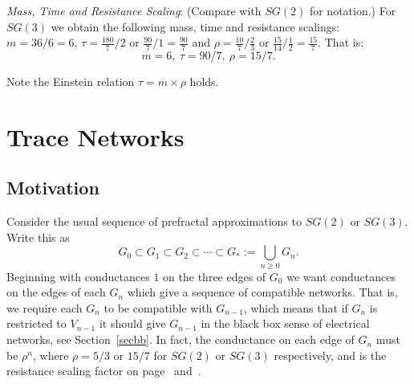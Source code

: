 \documentclass[a4paper]{amsart}
\theoremstyle{plain}
\theoremstyle{definition}
\theoremstyle{remark}
\begin{document}
%
 
 \medskip
\emph{Mass, Time and Resistance Scaling}:  \label{sc3}(Compare with $ SG(2) $ for notation.)  For $ SG(3) $ we obtain  the following mass, time and resistance scalings:
$ m =  {36}/{6}=6$,  $   \tau = \frac{180}{7}\Big/2 \text{ or } \frac{90}{7}\Big/ 1 = \frac{90}{7}$  and   
  $ \rho = \frac{10}{7}\Big/\frac{2}{3}  \text{ or } \frac{15}{14}\Big/ \frac{1}{2}  = \frac{15}{7}$.
That is:
\begin{equation} \label{rssg3}
\boxed{m = 6,\  \tau = 90/7,\  \rho = 15/7.}
\end{equation} 

 Note the Einstein relation
$  \tau = m \times \rho $ 
holds. 




\section{\textbf{Trace Networks}}\label{secTN}

\subsection{Motivation} 

Consider the usual sequence of prefractal approximations to $ SG(2) $ or $ SG(3) $.
Write this as 
\[
G_0 \subset G_1 \subset G_2 \subset \cdots \subset G_*:=\bigcup_{n\geq 0}G_n.
\]
Beginning with conductances $ 1 $ on the three edges of $ G_0 $ we want conductances on the edges of each $ G_n $ which  give a sequence of compatible networks. That is, we require each $ G_n $ to be compatible with $ G_{n-1} $, which means that if $ G_{n} $ is restricted to $ V_{n-1} $ it should give $ G_{n-1} $ in the black box sense of electrical networks, see Section~\ref{secbb}.  In fact, the conductance  on each edge of $ G_n $ must
 be $  \rho^n  $, where $ \rho =5/3$ or $ 15/7 $ for $ SG(2) $ or $ SG(3) $ respectively,  and is the resistance scaling  factor on page~\pageref{sc2} and~\pageref{sc3}.
 
\end{document}
